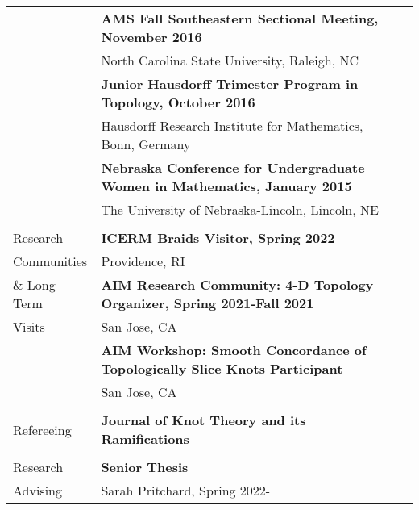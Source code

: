 \documentclass[letterpaper,11pt,oneside]{article}
\begin{document}
\begin{tabular}{@{} l l l}
 

     &\textbf{AMS Fall Southeastern Sectional Meeting, November 2016 } \\
     &  North Carolina State University, Raleigh, NC \\
 
     

     &\textbf{Junior Hausdorff Trimester Program in Topology, October 2016 } \\
     &  Hausdorff Research Institute for Mathematics, Bonn, Germany \\
    

&\textbf{Nebraska Conference for Undergraduate Women in Mathematics, January 2015 } \\
     &  The University of Nebraska-Lincoln, Lincoln, NE \\
    
     
%     
%     

\\

     
       \Large{Research}       & \textbf{ICERM Braids Visitor, Spring 2022} \\
       \Large {Communities} &  Providence, RI\\
     \Large{\& Long Term}    &  \textbf{AIM Research Community: 4-D Topology Organizer,  Spring 2021-Fall 2021}\\
       \Large{Visits}     & San Jose, CA\\
     & \textbf{AIM Workshop: Smooth Concordance of Topologically Slice Knots Participant} \\
     & San Jose, CA \\
     
     \\
     
     \Large{Refereeing }       &\textbf{Journal of Knot Theory and its Ramifications} \\
         
             
         \\
       \Large{Research }       & \textbf{Senior Thesis} \\
     \Large{Advising}    &  Sarah Pritchard,  Spring 2022-\\
    

\end{tabular}
\end{document}
